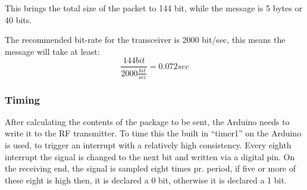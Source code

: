 \begin{table}[h]
\centering
{}
\caption{A table view of the content of transmitting \enquote{Hello} with RadioHead.}
\label{table:RH}
\end{table}

This brings the total size of the packet to 144 bit, while the message is 5 bytes or 40 bits.

The recommended bit-rate for the transceiver is 2000 bit/sec, this means the message will take at least:
\begin{equation}
\frac{144 bit}{2000 \frac{bit}{sec}} = 0.072 sec
\end{equation}

\subsubsection{Timing} 
After calculating the contents of the package to be sent, the Arduino needs to write it to the RF transmitter. 
To time this the built in ``timer1'' on the Arduino is used, to trigger an interrupt with a relatively high consistency.
Every eighth interrupt the signal is changed to the next bit and written via a digital pin. 
On the receiving end, the signal is sampled eight times pr. period, if five or more of these eight is high then, it is declared a 0 bit, otherwise it is declared a 1 bit. %

